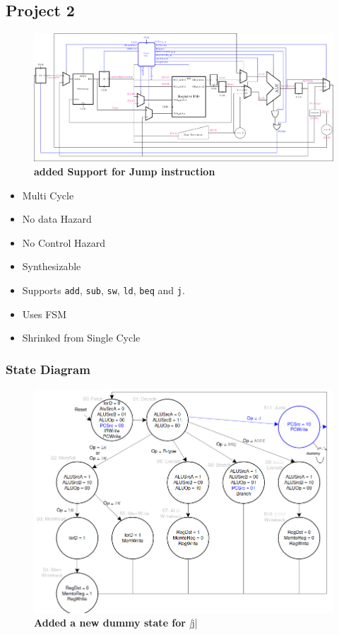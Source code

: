 \documentclass{article}
\begin{document}
\subsection*{Project 2}
\begin{figure}[H]
    \begin{center}
        \includegraphics[scale=0.74]{MultiCycleImplementation/TexFiles/MultiCycle2.pdf}
        \caption*{\textbf{added Support for Jump instruction}}
    \end{center}
\end{figure}
\begin{itemize}
    \item Multi Cycle
    \item No data Hazard
    \item No Control Hazard
    \item Synthesizable
    \item Supports \verb|add|, \verb|sub|, \verb|sw|, \verb|ld|, \verb|beq| and \verb|j|.
    \item Uses FSM
    \item Shrinked from Single Cycle
\end{itemize}
\subsubsection*{State Diagram}
\begin{figure}[H]
    \begin{center}
        \includegraphics[scale=0.5]{MultiCycleImplementation/MISPImplementationFSM_JUMP.png}
        \caption*{\textbf{Added a new dummy state for }\textit|j|}
    \end{center}
\end{figure}
\end{document}
